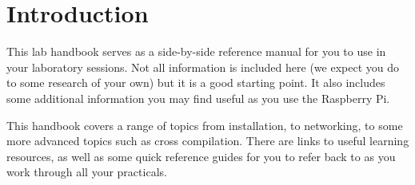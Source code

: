 \setcounter{section}{0}
\section{Introduction}
This lab handbook serves as a side-by-side reference manual for you to use in your laboratory sessions. Not all information is included here (we expect you do to some research of your own) but it is a good starting point. It also includes some additional information you may find useful as you use the Raspberry Pi.

This handbook covers a range of topics from installation, to networking, to some more advanced topics such as cross compilation. There are links to useful learning resources, as well as some quick reference guides for you to refer back to as you work through all your practicals.










